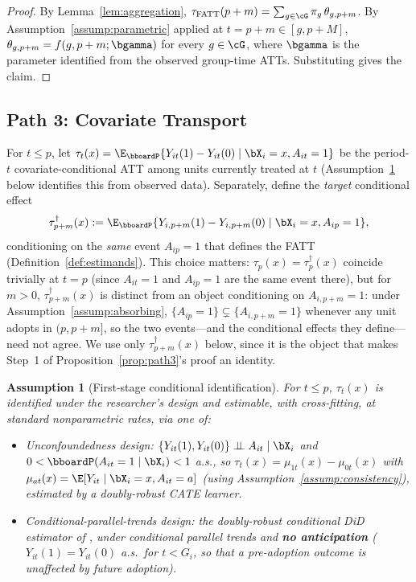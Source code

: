 \documentclass{article}
\renewcommand{\P}{\bboardP}
\newtheorem{assumption}{Assumption}
\begin{document}
\begin{proof}
By Lemma~\ref{lem:aggregation}, $\tau_{\mathrm{FATT}}(p+m) = \sum_{g\in\cG}\pi_g\,\theta_{g,p+m}$. By Assumption~\ref{assump:parametric} applied at $t = p+m \in [g, p+M]$, $\theta_{g,p+m} = f(g,p+m;\bgamma)$ for every $g \in \cG$, where $\bgamma$ is the parameter identified from the observed group-time ATTs. Substituting gives the claim.
\end{proof}

\subsection{Path 3: Covariate Transport}

For $t \leq p$, let $\tau_t(x) = \E_\P\{Y_{it}(1)-Y_{it}(0) \mid \bX_i = x, A_{it}=1\}$ be the period-$t$ covariate-conditional ATT among units currently treated at $t$ (Assumption~\ref{assump:cond-ident} below identifies this from observed data). Separately, define the \emph{target} conditional effect
\[
\tau^{\dagger}_{p+m}(x) := \E_\P\{Y_{i,p+m}(1)-Y_{i,p+m}(0) \mid \bX_i=x, A_{ip}=1\},
\]
conditioning on the \emph{same} event $A_{ip}=1$ that defines the FATT (Definition~\ref{def:estimands}). This choice matters: $\tau_p(x)=\tau^\dagger_p(x)$ coincide trivially at $t=p$ (since $A_{it}=1$ and $A_{ip}=1$ are the same event there), but for $m>0$, $\tau^\dagger_{p+m}(x)$ is distinct from an object conditioning on $A_{i,p+m}=1$: under Assumption~\ref{assump:absorbing}, $\{A_{ip}=1\}\subsetneq\{A_{i,p+m}=1\}$ whenever any unit adopts in $(p,p+m]$, so the two events---and the conditional effects they define---need not agree. We use only $\tau^\dagger_{p+m}(x)$ below, since it is the object that makes Step~1 of Proposition~\ref{prop:path3}'s proof an identity.

\begin{assumption}[First-stage conditional identification]
\label{assump:cond-ident}
For $t \leq p$, $\tau_t(x)$ is identified under the researcher's design and estimable, with cross-fitting, at standard nonparametric rates, via one of:
\begin{itemize}
\item \emph{Unconfoundedness design:} $\{Y_{it}(1),Y_{it}(0)\}\perp\!\!\!\perp A_{it}\mid \bX_i$ and $0<\P(A_{it}=1\mid \bX_i)<1$ a.s., so $\tau_t(x)=\mu_{1t}(x)-\mu_{0t}(x)$ with $\mu_{at}(x)=\E[Y_{it}\mid \bX_i=x,A_{it}=a]$ (using Assumption~\ref{assump:consistency}), estimated by a doubly-robust CATE learner.
\item \emph{Conditional-parallel-trends design:} the doubly-robust conditional DiD estimator of \citet{santannaDoublyRobustDifferenceindifferences2020}, under conditional parallel trends and \textbf{no anticipation} ($Y_{it}(1)=Y_{it}(0)$ a.s.\ for $t<G_i$, so that a pre-adoption outcome is unaffected by future adoption).
\end{itemize}
\end{assumption}
\end{document}
